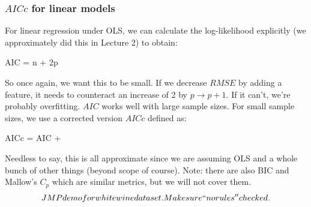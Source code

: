 \documentclass[handout]{beamer}
\begin{document}
\begin{frame}\frametitle{$AICc$ for linear models}
\small
For linear regression under OLS, we can calculate the log-likelihood explicitly (we approximately did this in Lecture 2) to obtain:

\beqn
AIC = n + 2p
\eeqn

\pause So once again, we want this to be small. If we decrease $RMSE$ by adding a feature, it needs to counteract an increase of 2 by $p \rightarrow p+1$. If it can't, we're probably overfitting. \pause $AIC$ works well with large sample sizes. For small sample sizes, we use a corrected version $AICc$ defined as:

\beqn
AICc = AIC + 
\eeqn

Needless to say, this is all approximate since we are assuming OLS and a whole bunch of other things (beyond scope of course). \pause Note: there are also BIC and Mallow's $C_p$ which are similar metrics, but we will not cover them. \pause \[JMP demo for white wine dataset. Make sure ``no rules'' checked.\]
	
\end{frame}

\begin{frame}\frametitle{}

	
\end{frame}
\end{document}
